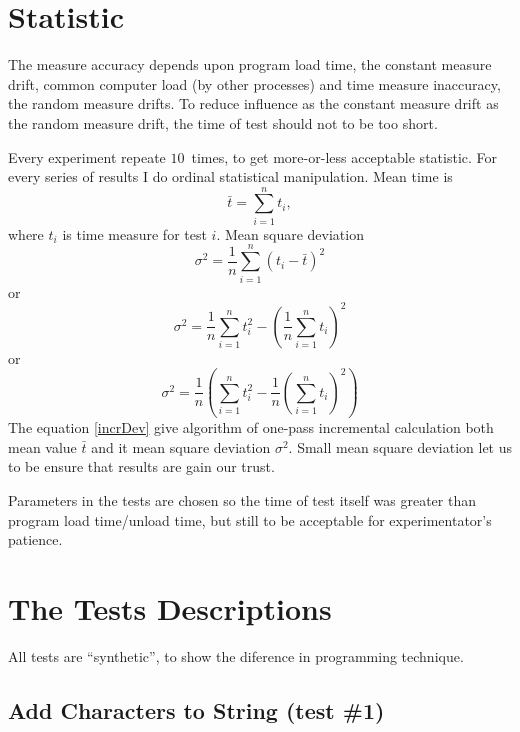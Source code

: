 \documentclass[a4paper]{article}
\begin{document}
\section{Statistic}

The measure accuracy
depends upon program load time, the constant measure drift, common computer load (by other processes) and time measure inaccuracy, the random measure drifts.
To reduce influence as the constant measure drift as the random measure drift, the time of test should not to be too short.

Every experiment repeate $10$~times, to get more-or-less acceptable statistic.
For every series of results I do ordinal statistical manipulation.
Mean time is
\begin{equation}
\bar t = \sum_{i = 1}^{n} t_i,
\end{equation}
where $t_i$ is time measure for test $i$.
Mean square deviation
\begin{equation}
\sigma^2 = \frac{1}{n}\sum_{i = 1}^{n} (t_i - \bar t)^2
\end{equation}
or
\begin{equation}
\sigma^2 = \frac{1}{n}\sum_{i = 1}^{n} t_i^2 - \left(\frac{1}{n}\sum_{i = 1}^{n} t_i\right)^2
\end{equation}
or
\begin{equation}
\sigma^2 = \frac{1}{n} \left(\sum_{i = 1}^{n} t_i^2 - 
                        \frac{1}{n}\left(\sum_{i = 1}^{n} t_i\right)^2\right)\label{incrDev}
\end{equation}
The equation \ref{incrDev} give algorithm of one-pass incremental calculation
both mean value $\bar t$ and it mean square deviation $\sigma^2$.
Small mean square deviation let us to be ensure that results are gain our trust.

Parameters in the tests are chosen so the time of test itself was greater than program
load time/unload time, but still to be acceptable for experimentator's patience.


\section{The Tests Descriptions\label{TestsDescr}}

All tests are ``synthetic'', to show the diference in programming
technique.

\subsection{Add Characters to String\label{incr-string}
(test \#1)}
\end{document}
